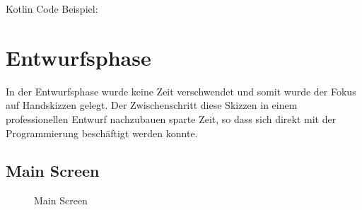 \documentclass[
    DIV12,
    cleardouble=plain,
    headings=normal,
    pdftex,
    headexclude,footexclude,
    final
]{scrreprt}
\begin{document}
Kotlin Code Beispiel:


\newpage

\chapter{Entwurfsphase}
In der Entwurfsphase wurde keine Zeit verschwendet und somit wurde der Fokus auf Handskizzen gelegt. Der Zwischenschritt diese Skizzen in einem professionellen Entwurf nachzubauen sparte Zeit, so dass sich direkt mit der Programmierung beschäftigt werden konnte.



\section{Main Screen}
\begin{figure}[H]
	\centering
	\caption{Main Screen}
	\label{main}
\end{figure}
\end{document}
